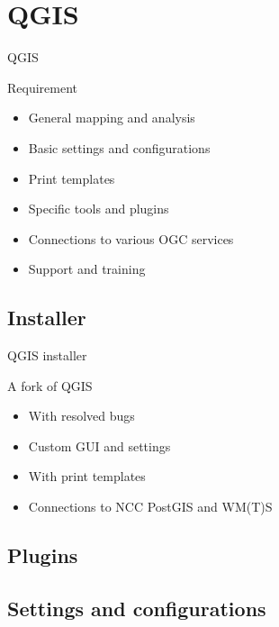 \section{QGIS}

\begin{frame}{QGIS}
		\begin{block}{Requirement}
			\begin{itemize}
				\item General mapping and analysis
				\item Basic settings and configurations
				\item Print templates
				\item Specific tools and plugins 
				\item Connections to various OGC services
				\item Support and training
			\end{itemize}
		\end{block}
\end{frame}


\subsection{Installer}
\begin{frame}{QGIS installer}
	\begin{block}{A fork of QGIS}
		\begin{itemize}
			\item With resolved bugs
			\item Custom GUI and settings
			\item With print templates
			\item Connections to NCC PostGIS and WM(T)S
		\end{itemize}
	\end{block}
\end{frame}


\subsection{Plugins}


\subsection{Settings and configurations}


